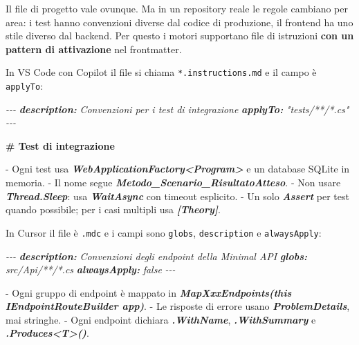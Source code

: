 \documentclass[
  italian,
  10pt,
]{book}
\newenvironment{Shaded}{\begin{snugshade}}{\end{snugshade}}
\newcommand{\AnnotationTok}[1]{\textcolor[rgb]{0.56,0.35,0.01}{\textbf{\textit{#1}}}}
\newcommand{\CommentTok}[1]{\textcolor[rgb]{0.56,0.35,0.01}{\textit{#1}}}
\newcommand{\FunctionTok}[1]{\textcolor[rgb]{0.13,0.29,0.53}{\textbf{#1}}}
\newcommand{\InformationTok}[1]{\textcolor[rgb]{0.56,0.35,0.01}{\textbf{\textit{#1}}}}
\newcommand{\NormalTok}[1]{#1}
\newcommand{\SpecialStringTok}[1]{\textcolor[rgb]{0.31,0.60,0.02}{#1}}
\begin{document}
Il file di progetto vale ovunque. Ma in un repository reale le regole
cambiano per area: i test hanno convenzioni diverse dal codice di
produzione, il frontend ha uno stile diverso dal backend. Per questo i
motori supportano file di istruzioni \textbf{con un pattern di
attivazione} nel frontmatter.

In VS Code con Copilot il file si chiama \texttt{*.instructions.md} e il
campo è \texttt{applyTo}:

\begin{Shaded}
\begin{Highlighting}[]
\CommentTok{{-}{-}{-}}
\AnnotationTok{description:}\CommentTok{ Convenzioni per i test di integrazione}
\AnnotationTok{applyTo:}\CommentTok{ "tests/**/*.cs"}
\CommentTok{{-}{-}{-}}

\FunctionTok{\# Test di integrazione}

\SpecialStringTok{{-} }\NormalTok{Ogni test usa }\InformationTok{\textasciigrave{}WebApplicationFactory\textless{}Program\textgreater{}\textasciigrave{}}\NormalTok{ e un database SQLite in memoria.}
\SpecialStringTok{{-} }\NormalTok{Il nome segue }\InformationTok{\textasciigrave{}Metodo\_Scenario\_RisultatoAtteso\textasciigrave{}}\NormalTok{.}
\SpecialStringTok{{-} }\NormalTok{Non usare }\InformationTok{\textasciigrave{}Thread.Sleep\textasciigrave{}}\NormalTok{: usa }\InformationTok{\textasciigrave{}WaitAsync\textasciigrave{}}\NormalTok{ con timeout esplicito.}
\SpecialStringTok{{-} }\NormalTok{Un solo }\InformationTok{\textasciigrave{}Assert\textasciigrave{}}\NormalTok{ per test quando possibile; per i casi multipli usa }\InformationTok{\textasciigrave{}[Theory]\textasciigrave{}}\NormalTok{.}
\end{Highlighting}
\end{Shaded}

In Cursor il file è \texttt{.mdc} e i campi sono \texttt{globs},
\texttt{description} e \texttt{alwaysApply}:

\begin{Shaded}
\begin{Highlighting}[]
\CommentTok{{-}{-}{-}}
\AnnotationTok{description:}\CommentTok{ Convenzioni degli endpoint della Minimal API}
\AnnotationTok{globs:}\CommentTok{ src/Api/**/*.cs}
\AnnotationTok{alwaysApply:}\CommentTok{ false}
\CommentTok{{-}{-}{-}}

\SpecialStringTok{{-} }\NormalTok{Ogni gruppo di endpoint è mappato in }\InformationTok{\textasciigrave{}MapXxxEndpoints(this IEndpointRouteBuilder app)\textasciigrave{}}\NormalTok{.}
\SpecialStringTok{{-} }\NormalTok{Le risposte di errore usano }\InformationTok{\textasciigrave{}ProblemDetails\textasciigrave{}}\NormalTok{, mai stringhe.}
\SpecialStringTok{{-} }\NormalTok{Ogni endpoint dichiara }\InformationTok{\textasciigrave{}.WithName\textasciigrave{}}\NormalTok{, }\InformationTok{\textasciigrave{}.WithSummary\textasciigrave{}}\NormalTok{ e }\InformationTok{\textasciigrave{}.Produces\textless{}T\textgreater{}()\textasciigrave{}}\NormalTok{.}
\end{Highlighting}
\end{Shaded}
\end{document}
